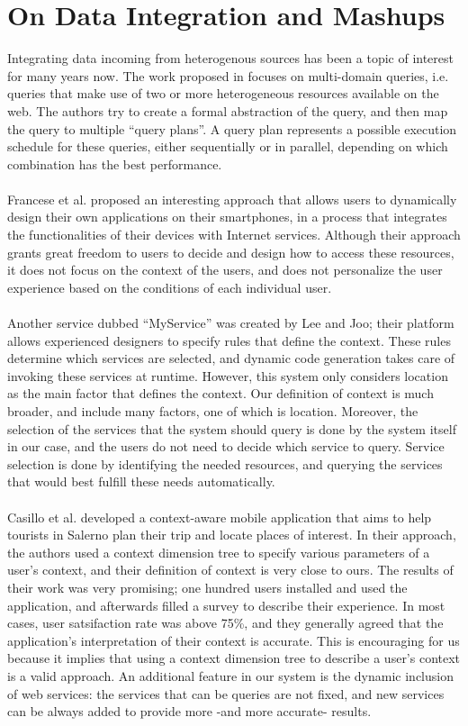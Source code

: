 \section{On Data Integration and Mashups}
Integrating data incoming from heterogenous sources has been a topic of interest for many years now. The work proposed in \cite{braga} focuses on multi-domain queries, i.e. queries that make use of two or more heterogeneous resources available on the web. The authors try to create a formal abstraction of the query, and then map the query to multiple ``query plans''. A query plan represents a possible execution schedule for these queries, either sequentially or in parallel, depending on which combination has the best performance.\\\\
Francese et al.\cite{dynamicapp} proposed an interesting approach that allows users to dynamically design their own applications on their smartphones, in a process that integrates the functionalities of their devices with Internet services. Although their approach grants great freedom to users to decide and design how to access these resources, it does not focus on the context of the users, and does not personalize the user experience based on the conditions of each individual user.\\\\
Another service dubbed ``MyService'' was created by Lee and Joo\cite{myservice}; their platform allows experienced designers to specify rules that define the context. These rules determine which services are selected, and dynamic code generation takes care of invoking these services at runtime. However, this system only considers location as the main factor that defines the context. Our definition of context is much broader, and include many factors, one of which is location. Moreover, the selection of the services that the system should query is done by the system itself in our case, and the users do not need to decide which service to query. Service selection is done by identifying the needed resources, and querying the services that would best fulfill these needs automatically.\\\\
Casillo et al.\cite{casillo} developed a context-aware mobile application that aims to help tourists in Salerno plan their trip and locate places of interest. In their approach, the authors used a context dimension tree to specify various parameters of a user's context, and their definition of context is very close to ours. The results of their work was very promising; one hundred users installed and used the application, and afterwards filled a survey to describe their experience. In most cases, user satsifaction rate was above 75\%, and they generally agreed that the application's interpretation of their context is accurate. This is encouraging for us because it implies that using a context dimension tree to describe a user's context is a valid approach. An additional feature in our system is the dynamic inclusion of web services: the services that can be queries are not fixed, and new services can be always added to provide more -and more accurate- results.\\\\
